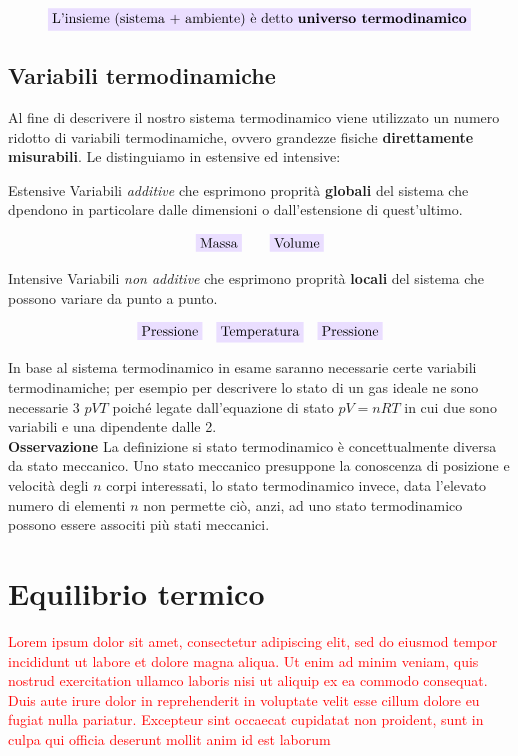 \documentclass[x11names]{report}
\newcommand{\viola}[1]{\colorbox{yred}{$\displaystyle #1$}}
\begin{document}
	\[ 
	\viola{\text{{L'insieme (sistema + ambiente) è detto \textbf{universo termodinamico}}}}
	\]
	\subsection{Variabili termodinamiche}
	Al fine di descrivere il nostro sistema termodinamico viene utilizzato un numero ridotto di variabili termodinamiche, ovvero grandezze fisiche \textbf{direttamente misurabili}. Le distinguiamo in estensive ed intensive:
	
	\begin{center}
		\begin{minipage}{0.49\textwidth}
			\begin{es}{Estensive}
				Variabili \textit{additive} che esprimono proprità \textbf{globali} del sistema che dpendono in particolare dalle dimensioni o dall'estensione di quest'ultimo.
				
				\[\viola{\text{Massa}} \qquad \viola{\text{Volume}}\]
				
			\end{es}
		\end{minipage}
		\begin{minipage}{0.49\textwidth}
			\begin{es}{Intensive}
				Variabili \textit{non additive} che esprimono proprità \textbf{locali} del sistema che possono variare da punto a punto.
				
				\[\viola{\text{Pressione}} \quad \viola{\text{Temperatura}}\quad \viola{\text{Pressione}}\]
				
			\end{es}
		\end{minipage}
	\end{center}
	In base al sistema termodinamico in esame saranno necessarie certe variabili termodinamiche; per esempio per descrivere lo stato di un gas ideale ne sono necessarie 3 \(pVT\) poiché legate dall'equazione di stato \( pV = nRT\) in cui due sono variabili e una dipendente dalle 2.\\
	
	\noindent
	\textbf{Osservazione}  La definizione si stato termodinamico è concettualmente diversa da stato meccanico. Uno stato meccanico presuppone la conoscenza di posizione e velocità degli \(n\) corpi interessati, lo stato termodinamico invece, data l'elevato numero di elementi \(n\) non permette ciò, anzi, ad uno stato termodinamico possono essere associti più stati meccanici.
	
	\section{Equilibrio termico}
	\textcolor{red}{Lorem ipsum dolor sit amet, consectetur adipiscing elit, sed do eiusmod tempor incididunt ut labore et dolore magna aliqua. Ut enim ad minim veniam, quis nostrud exercitation ullamco laboris nisi ut aliquip ex ea commodo consequat. Duis aute irure dolor in reprehenderit in voluptate velit esse cillum dolore eu fugiat nulla pariatur. Excepteur sint occaecat cupidatat non proident, sunt in culpa qui officia deserunt mollit anim id est laborum}\\
	
\end{document}
